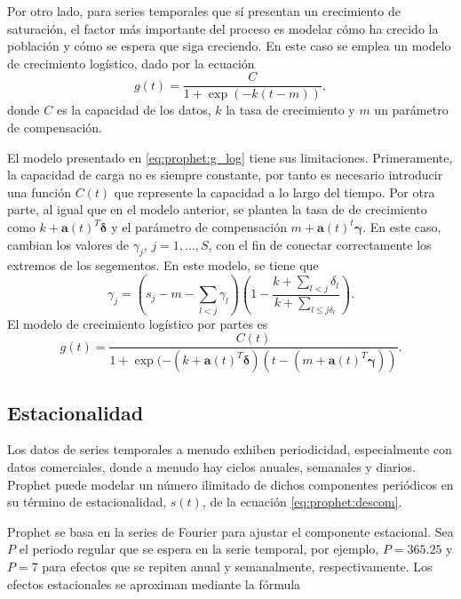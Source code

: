 \documentclass[12pt,twoside]{article}
\begin{document}
Por otro lado, para series temporales que sí presentan un crecimiento de saturación, el factor más importante del proceso es modelar cómo ha crecido la población y cómo se espera que siga creciendo. En este caso se emplea un modelo de crecimiento logístico, dado por la ecuación
\begin{equation}\label{eq:prophet:g_log}
    g(t) = \frac{C}{1 + \exp{(-k(t-m))}},
\end{equation}
donde $C$ es la capacidad de los datos, $k$ la tasa de crecimiento y $m$ un parámetro de compensación. 

El modelo presentado en \eqref{eq:prophet:g_log} tiene sus limitaciones. Primeramente, la capacidad de carga no es siempre constante, por tanto es necesario introducir una función $C(t)$ que represente la capacidad a lo largo del tiempo. Por otra parte, al igual que en el modelo anterior, se plantea la tasa de de crecimiento como $k + \mathbf{a}(t)^T\boldsymbol{\delta}$ y el parámetro de compensación $m + \mathbf{a}(t)^t\boldsymbol{\gamma}$. En este caso, cambian los valores de $\gamma_j$, $j=1,\dotsc,S$, con el fin de conectar correctamente los extremos de los segementos. En este modelo, se tiene que 
\begin{equation}
    \gamma_j = \left(s_j-m-\sum_{l<j}\gamma_l\right)\left(1 - \frac{k+\sum_{l<j}\delta_l}{k+\sum_{l\leq j\delta_l}}\right).
\end{equation}
El modelo de crecimiento logístico por partes es 
\begin{equation}\label{eq:prophet:g_log2}
     g(t) = \frac{C(t)}{1 + \exp{(-(k+\mathbf{a}(t)^T\boldsymbol{\delta})(t-(m+\mathbf{a}(t)^T\boldsymbol{\gamma}))}}.
\end{equation}

\subsection{Estacionalidad}
Los datos de series temporales a menudo exhiben periodicidad, especialmente con datos comerciales, donde a menudo hay ciclos anuales, semanales y diarios. Prophet puede modelar un número ilimitado de dichos componentes periódicos en su término de estacionalidad, $s(t)$, de la ecuación \eqref{eq:prophet:descom}.

Prophet se basa en la series de Fourier para ajustar el componente estacional. Sea $P$ el periodo regular que se espera en la serie temporal, por ejemplo, $P=365.25$ y $P=7$ para efectos que se repiten anual y semanalmente, respectivamente. Los efectos estacionales se aproximan mediante la fórmula
\end{document}
